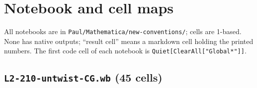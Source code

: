 \documentclass[10pt]{article}
\newcommand{\nb}[1]{\texttt{#1}}
\begin{document}
\appendix

\section{Notebook and cell maps}\label{app:cells}

All notebooks are in \nb{Paul/\allowbreak{}Mathematica/\allowbreak{}new-\allowbreak{}conventions/\allowbreak{}}; cells are 1-based. None has native outputs; ``result cell'' means a markdown cell holding the printed numbers. The first code cell of each notebook is \nb{Quiet[ClearAll["Global\textasciigrave{}*"]]}.

\subsection{\nb{L2-\allowbreak{}210-\allowbreak{}untwist-\allowbreak{}CG.\allowbreak{}wb} (45 cells)}\label{sec:cellsA}
\end{document}
